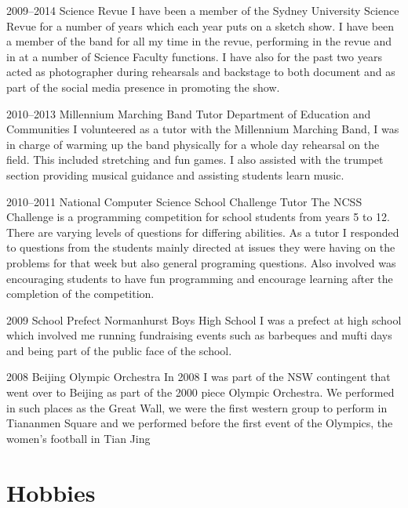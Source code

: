 \documentclass[print]{friggeri-cv} %
\begin{document}
{\begin{entrylist}
\entry
{2009--2014}
{Science Revue}
{}
{I have been a member of the Sydney University Science Revue for a number of years which each year puts on a sketch show. I have been a member of the band for all my time in the revue, performing in the revue and in at a number of Science Faculty functions. I have also for the past two years acted as photographer during rehearsals and backstage to both document and as part of the social media presence in promoting the show.
}

\entry
{2010--2013}
{Millennium Marching Band Tutor}
{Department of Education and Communities}
{I volunteered as a tutor with the Millennium Marching Band, I was in charge of warming up the band physically for a whole day rehearsal on the field. This included stretching and fun games. I also assisted with the trumpet section providing musical guidance and assisting students learn music.}

\entry
{2010--2011}
{National Computer Science School Challenge Tutor}
{}
{The NCSS Challenge is a programming competition for school students from years 5 to 12. There are varying levels of questions for differing abilities. As a tutor I responded to questions from the students mainly directed at issues they were having on the problems for that week but also general programing questions. Also involved was encouraging students to have fun programming and encourage learning after the completion of the competition.}

\entry
{2009}
{School Prefect}
{Normanhurst Boys High School}
{I was a prefect at high school which involved me running fundraising events such as barbeques and mufti days and being part of the public face of the school.}

\entry
{2008}
{Beijing Olympic Orchestra}
{}
{In 2008 I was part of the NSW contingent that went over to Beijing as part of the 2000 piece Olympic Orchestra. We performed in such places as the Great Wall, we were the first western group to perform in Tiananmen Square and we performed before the first event of the Olympics, the women's football in Tian Jing}


\end{entrylist}


\section{Hobbies}

}
\end{document}
